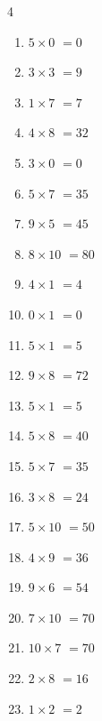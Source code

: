 \begin{multicols}{4}
\begin{enumerate}
  \item $5\times 0$
        $=0$

  \item $3\times 3$
        $=9$

  \item $1\times 7$
        $=7$

  \item $4\times 8$
        $=32$

\columnbreak %

  \item $3\times 0$
        $=0$

  \item $5\times 7$
        $=35$

  \item $9\times 5$
        $=45$

  \item $8\times 10$
        $=80$

  \item $4\times 1$
        $=4$

  \item $0\times 1$
        $=0$

  \item $5\times 1$
        $=5$

  \item $9\times 8$
        $=72$

  \item $5\times 1$
        $=5$

  \item $5\times 8$
        $=40$

  \item $5\times 7$
        $=35$

  \item $3\times 8$
        $=24$

  \item $5\times 10$
        $=50$

  \item $4\times 9$
        $=36$

  \item $9\times 6$
        $=54$

  \item $7\times 10$
        $=70$

  \item $10\times 7$
        $=70$

  \item $2\times 8$
        $=16$

  \item $1\times 2$
        $=2$


\end{enumerate}
\end{multicols}

